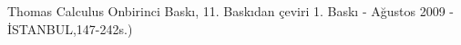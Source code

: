 \begin{thebibliography}{99}
 Thomas Calculus Onbirinci Baskı, 11. Baskıdan çeviri 1. Baskı - Ağustos 2009 - İSTANBUL,147-242s.)
\end{thebibliography}



